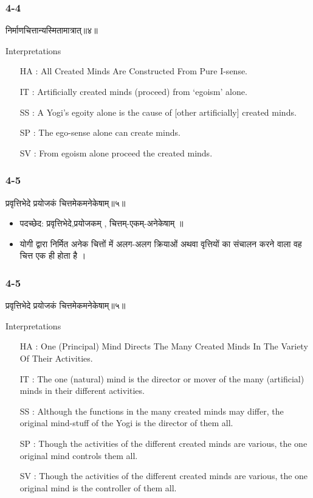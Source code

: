\begin{frame}[fragile]\frametitle{4-4}
\begin{sanskrit}
निर्माणचित्तान्यस्मितामात्रात्॥४॥
\end{sanskrit}

Interpretations
\begin{itemize}	
\item [HA]: All Created Minds Are Constructed From Pure I-sense.
\item [IT]: Artificially created minds (proceed) from ‘egoism’ alone.
\item [SS]: A Yogi’s egoity alone is the cause of [other artificially] created minds.
\item [SP]: The ego-sense alone can create minds.
\item [SV]: From egoism alone proceed the created minds. 
\end{itemize}
\end{frame}

\begin{frame}[fragile]\frametitle{4-5}
\begin{sanskrit}
प्रवृत्तिभेदे प्रयोजकं चित्तमेकमनेकेषाम्॥५॥
\end{sanskrit}

\begin{itemize}
\item पदच्छेद:  प्रवृत्तिभेदे,प्रयोजकम् , चित्तम्-एकम्-अनेकेषाम् ॥
\item योगी द्वारा निर्मित अनेक चित्तों में अलग-अलग क्रियाओं अथवा वृत्तियों का संचालन करने वाला वह चित्त एक ही होता है ।
\end{itemize}
\end{frame}



\begin{frame}[fragile]\frametitle{4-5}
\begin{sanskrit}
प्रवृत्तिभेदे प्रयोजकं चित्तमेकमनेकेषाम्॥५॥
\end{sanskrit}

Interpretations
\begin{itemize}	
\item [HA]: One (Principal) Mind Directs The Many Created Minds In The Variety Of Their Activities.
\item [IT]: The one (natural) mind is the director or mover of the many (artificial) minds in their different activities.
\item [SS]: Although the functions in the many created minds may differ, the original mind-stuff of the Yogi is the director of them all.
\item [SP]: Though the activities of the different created minds are various, the one original mind controls them all.
\item [SV]: Though the activities of the different created minds are various, the one original mind is the controller of them all. 
\end{itemize}
\end{frame}

